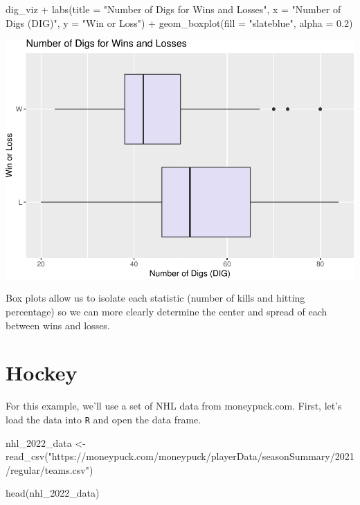 \documentclass[
  11pt,
]{book}
\newenvironment{Shaded}{\begin{snugshade}}{\end{snugshade}}
\newcommand{\AttributeTok}[1]{\textcolor[rgb]{0.77,0.63,0.00}{#1}}
\newcommand{\FloatTok}[1]{\textcolor[rgb]{0.00,0.00,0.81}{#1}}
\newcommand{\FunctionTok}[1]{\textcolor[rgb]{0.00,0.00,0.00}{#1}}
\newcommand{\NormalTok}[1]{#1}
\newcommand{\OtherTok}[1]{\textcolor[rgb]{0.56,0.35,0.01}{#1}}
\newcommand{\SpecialCharTok}[1]{\textcolor[rgb]{0.00,0.00,0.00}{#1}}
\newcommand{\StringTok}[1]{\textcolor[rgb]{0.31,0.60,0.02}{#1}}
\theoremstyle{definition}
\theoremstyle{definition}
\theoremstyle{definition}
\theoremstyle{definition}
\theoremstyle{remark}
\begin{document}
\begin{Shaded}
\begin{Highlighting}[]
\NormalTok{dig\_viz }\SpecialCharTok{+} \FunctionTok{labs}\NormalTok{(}\AttributeTok{title =} \StringTok{"Number of Digs for Wins and Losses"}\NormalTok{, }\AttributeTok{x =} \StringTok{"Number of Digs (DIG)"}\NormalTok{,}
    \AttributeTok{y =} \StringTok{"Win or Loss"}\NormalTok{) }\SpecialCharTok{+} \FunctionTok{geom\_boxplot}\NormalTok{(}\AttributeTok{fill =} \StringTok{"slateblue"}\NormalTok{, }\AttributeTok{alpha =} \FloatTok{0.2}\NormalTok{)}
\end{Highlighting}
\end{Shaded}

\includegraphics{series_files/figure-latex/unnamed-chunk-22-2.pdf}

Box plots allow us to isolate each statistic (number of kills and hitting percentage) so we can more clearly determine the center and spread of each between wins and losses.

\hypertarget{hockey}{%
\section{Hockey}\label{hockey}}

For this example, we'll use a set of NHL data from moneypuck.com. First, let's load the data into \texttt{R} and open the data frame.

\begin{Shaded}
\begin{Highlighting}[]
\NormalTok{nhl\_2022\_data }\OtherTok{\textless{}{-}} \FunctionTok{read\_csv}\NormalTok{(}\StringTok{"https://moneypuck.com/moneypuck/playerData/seasonSummary/2021/regular/teams.csv"}\NormalTok{)}

\FunctionTok{head}\NormalTok{(nhl\_2022\_data)}
\end{Highlighting}
\end{Shaded}
\end{document}
